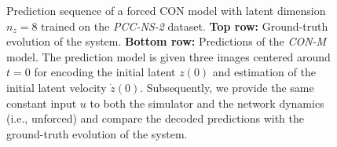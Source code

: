 \begin{figure}[hb]
    \caption{Prediction sequence of a forced \gls{CON} model with latent dimension $n_z=8$ trained on the \emph{PCC-NS-2} dataset. 
    \textbf{Top row:} Ground-truth evolution of the system. \textbf{Bottom row:} Predictions of the \emph{CON-M} model. \newline
    The prediction model is given three images centered around $t=0$ for encoding the initial latent $z(0)$ and estimation of the initial latent velocity $\dot{z}(0)$. Subsequently, we provide the same constant input $u$ to both the simulator and the network dynamics (i.e., unforced) and compare the decoded predictions with the ground-truth evolution of the system.  
    }\label{fig:apx-con:latent_dynamics:sequence_of_stills:pcc_ns-2:rollout1}
\end{figure}